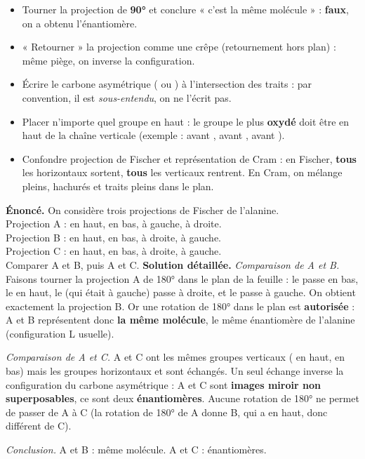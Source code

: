 \documentclass[11pt]{article}
\begin{document}
\begin{attention}
\begin{itemize}
\item Tourner la projection de \textbf{90°} et conclure « c'est la même molécule » : \textbf{faux}, on a obtenu l'énantiomère.
\item « Retourner » la projection comme une crêpe (retournement hors plan) : même piège, on inverse la configuration.
\item Écrire le carbone asymétrique ( ou ) à l'intersection des traits : par convention, il est \emph{sous-entendu}, on ne l'écrit pas.
\item Placer n'importe quel groupe en haut : le groupe le plus \textbf{oxydé} doit être en haut de la chaîne verticale (exemple :  avant ,  avant ,  avant ).
\item Confondre projection de Fischer et représentation de Cram : en Fischer, \textbf{tous} les horizontaux sortent, \textbf{tous} les verticaux rentrent. En Cram, on mélange pleins, hachurés et traits pleins dans le plan.
\end{itemize}
\end{attention}

\begin{exoresolu}
\textbf{Énoncé.} On considère trois projections de Fischer de l'alanine.\\
Projection A :  en haut,  en bas,  à gauche,  à droite.\\
Projection B :  en haut,  en bas,  à droite,  à gauche.\\
Projection C :  en haut,  en bas,  à droite,  à gauche.\\
Comparer A et B, puis A et C.
\tcblower
\textbf{Solution détaillée.}
\emph{Comparaison de A et B.} Faisons tourner la projection A de 180° dans le plan de la feuille : le  passe en bas, le  en haut, le  (qui était à gauche) passe à droite, et le  passe à gauche. On obtient exactement la projection B. Or une rotation de 180° dans le plan est \textbf{autorisée} : A et B représentent donc \textbf{la même molécule}, le même énantiomère de l'alanine (configuration L usuelle).

\emph{Comparaison de A et C.} A et C ont les mêmes groupes verticaux ( en haut,  en bas) mais les groupes horizontaux  et  sont échangés. Un seul échange inverse la configuration du carbone asymétrique : A et C sont \textbf{images miroir non superposables}, ce sont deux \textbf{énantiomères}. Aucune rotation de 180° ne permet de passer de A à C (la rotation de 180° de A donne B, qui a  en haut, donc différent de C).

\emph{Conclusion.} A et B : même molécule. A et C : énantiomères.
\end{exoresolu}
\end{document}
